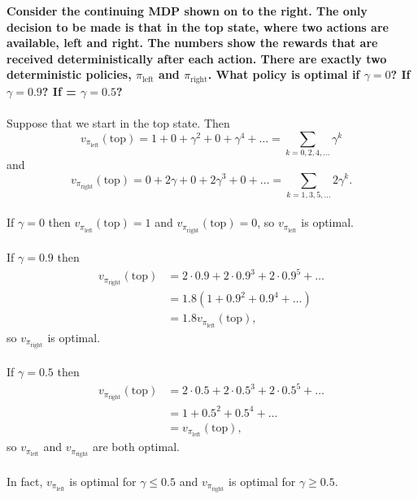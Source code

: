 \documentclass[a4paper,11pt]{article}
\numberwithin{equation}{section}
\theoremstyle{remark}
\begin{document}
\textbf{Consider the continuing MDP shown on to the right. The only decision to be made is that in the top state, where two actions are available, left and right. The numbers show the rewards that are received deterministically after each action. There are exactly two deterministic policies, $\pi_{\text{left}}$ and $\pi_{\text{right}}$. What policy is optimal if $\gamma = 0$? If  $\gamma = 0.9$? If  = $\gamma = 0.5$?}
\\ \\
Suppose that we start in the top state. Then
\[
	v_{\pi_{\text{left}}}(\text{top}) = 1 + 0 + \gamma^2 + 0 + \gamma^4 + \dots = \sum_{k=0, 2, 4, \dots} \gamma^k
\]
and
\[
	v_{\pi_{\text{right}}}(\text{top}) = 0 + 2\gamma + 0 + 2 \gamma^3 + 0 + \dots = \sum_{k=1, 3, 5, \dots} 2\gamma^k.
\]
\\
If $\gamma = 0$ then $v_{\pi_{\text{left}}}(\text{top}) = 1$ and $v_{\pi_{\text{right}}}(\text{top}) = 0$, so $v_{\pi_{\text{left}}}$ is optimal.
\\ \\ 
If $\gamma = 0.9$ then
\begin{align*}
	v_{\pi_{\text{right}}}(\text{top}) & = 2 \cdot 0.9 + 2 \cdot 0.9^3 + 2 \cdot 0.9^5 + \dots  \\
									   & = 1.8(1 + 0.9^2 + 0.9^4 + \dots ) \\
									   & = 1.8 v_{\pi_{\text{left}}}(\text{top}),
\end{align*}
so $v_{\pi_{\text{right}}}$ is optimal.
\\ \\
If $\gamma = 0.5$ then 
\begin{align*}
	v_{\pi_{\text{right}}}(\text{top}) & = 2 \cdot 0.5 + 2 \cdot 0.5^3 + 2 \cdot 0.5^5 + \dots  \\
									   & = 1 + 0.5^2 + 0.5^4 + \dots \\
									   & = v_{\pi_{\text{left}}}(\text{top}),
\end{align*}
so $v_{\pi_{\text{left}}}$ and $v_{\pi_{\text{right}}}$ are both optimal.
\\ \\
In fact, $v_{\pi_{\text{left}}}$ is optimal for $\gamma \leq 0.5$ and $v_{\pi_{\text{right}}}$ is optimal for $\gamma \geq 0.5$.
 	
\end{document}
